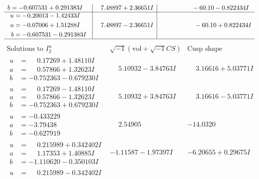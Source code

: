 \documentclass[1p]{elsarticle_modified}
\theoremstyle{definition}
\newcommand{\I}{\sqrt{-1}}
\begin{document}
$$\begin{array}{c|c|c}
\begin{aligned}
b &= -0.607531 + 0.291383 I\end{aligned}
 & \phantom{-}7.48897 + 2.36651 I & \phantom{-0.000000 }      -6
0. 10   - 0.822434 I \\ \hline\begin{aligned}
u &= -0.20013 - 1.42433 I \\
a &= -0.07006 + 1.51288 I \\
b &= -0.607531 - 0.291383 I\end{aligned}
 & \phantom{-}7.48897 - 2.36651 I & \phantom{-0.000000 -}     -6
0. 10   + 0.822434 I\\
 \hline 
 \end{array}$$\newpage$$\begin{array}{c|c|c}  
\text{Solutions to }I^u_{2}& \I (\text{vol} + \sqrt{-1}CS) & \text{Cusp shape}\\
 \hline 
\begin{aligned}
u &= \phantom{-}0.17269 + 1.48110 I \\
a &= \phantom{-}0.57866 + 1.32623 I \\
b &= -0.752363 - 0.679230 I\end{aligned}
 & \phantom{-}5.10932 - 3.84763 I & \phantom{-}3.16616 + 5.03771 I \\ \hline\begin{aligned}
u &= \phantom{-}0.17269 - 1.48110 I \\
a &= \phantom{-}0.57866 - 1.32623 I \\
b &= -0.752363 + 0.679230 I\end{aligned}
 & \phantom{-}5.10932 + 3.84763 I & \phantom{-}3.16616 - 5.03771 I \\ \hline\begin{aligned}
u &= -0.433229\phantom{ +0.000000I} \\
a &= -3.79438\phantom{ +0.000000I} \\
b &= -0.627919\phantom{ +0.000000I}\end{aligned}
 & \phantom{-}2.54905\phantom{ +0.000000I} & -14.0320\phantom{ +0.000000I} \\ \hline\begin{aligned}
u &= \phantom{-}0.215989 + 0.342402 I \\
a &= \phantom{-}1.17353 + 1.40885 I \\
b &= -1.110620 - 0.350103 I\end{aligned}
 & -1.11587 - 1.97397 I & -6.20655 + 0.29675 I \\ \hline\begin{aligned}
u &= \phantom{-}0.215989 - 0.342402 I \\

\end{aligned}
\end{array}$$
\end{document}
